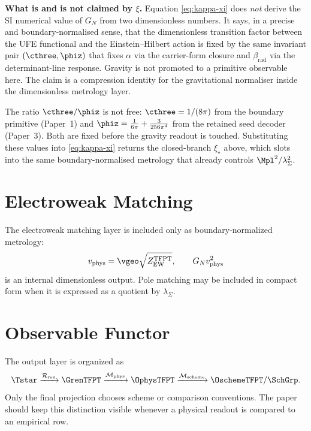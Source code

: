 \begin{tfptfrontbox}
\textbf{What is and is not claimed by $\xi$.} Equation \eqref{eq:kappa-xi} does \emph{not} derive
the SI numerical value of $G_N$ from two dimensionless numbers. It says, in a precise and
boundary-normalised sense, that the dimensionless transition factor between the UFE functional
and the Einstein--Hilbert action is fixed by the same invariant pair $(\cthree,\phiz)$ that fixes
$\alpha$ via the carrier-form closure and $\beta_{\mathrm{rad}}$ via the determinant-line
response. Gravity is not promoted to a primitive observable here. The claim is a compression
identity for the gravitational normaliser inside the dimensionless metrology layer.
\end{tfptfrontbox}

\begin{remark}
The ratio $\cthree/\phiz$ is not free: $\cthree=1/(8\pi)$ from the boundary primitive (Paper~1)
and $\phiz=\frac{1}{6\pi}+\frac{3}{256\pi^4}$ from the retained seed decoder (Paper~3). Both are
fixed before the gravity readout is touched. Substituting these values into
\eqref{eq:kappa-xi} returns the closed-branch $\xi_\star$ above, which slots into the same
boundary-normalised metrology that already controls $\Mpl^2/\lambda_\Sigma^2$.
\end{remark}

\section{Electroweak Matching}

The electroweak matching layer is included only as boundary-normalized metrology:
\[
v_{\mathrm{phys}}=\vgeo\sqrt{Z_{\mathrm{EW}}^{\mathrm{TFPT}}},
\qquad
G_Nv_{\mathrm{phys}}^2
\]
is an internal dimensionless output. Pole matching may be included in compact form when it is
expressed as a quotient by $\lambda_\Sigma$.

\section{Observable Functor}

The output layer is organized as
\[
\Tstar
\xrightarrow{\mathcal R_{\mathrm{ren}}}
\GrenTFPT
\xrightarrow{\mathcal M_{\mathrm{phys}}}
\OphysTFPT
\xrightarrow{\mathcal M_{\mathrm{scheme}}}
\OschemeTFPT/\SchGrp.
\]
Only the final projection chooses scheme or comparison conventions. The paper should keep this
distinction visible whenever a physical readout is compared to an empirical row.

